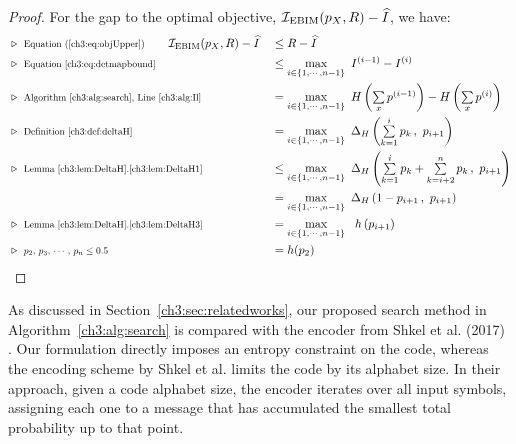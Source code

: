 \begin{proof}
    For the gap to the optimal objective, $\mathcal{I}_\text{EBIM}(p_X, R) - \widehat{I}$, we have:
    {\savebox\strutbox{$\vphantom{\dfrac11}$}
    \begin{alignat*}{2}
        \setlength{\arraycolsep}{-10pt}
        &\cmt{\text{Equation (\ref{ch3:eq:objUpper})}} \hspace{2em} \obj(p_X, R) - \widehat{I}                                      
        &&\leq R - \widehat{I} \\
        & \cmt{\text{Equation \eqref{ch3:eq:detmapbound}} }
        &&\leq \maxi \Imerged{i-1} - \Imerged{i} \\
        &\cmt{\text{Algorithm~\ref{ch3:alg:search}, Line~\ref{ch3:alg:Il}}}
        &&= \maxi \ent{ \xsum_x \Pmerged{i-1} } - \ent{ \xsum_x \Pmerged{i} } \\
        &\cmt{\text{Definition~\ref{ch3:def:deltaH}}}
        &&= \maxi \DeltaH{\xsum_{k=1}^i p_k}{p_{i+1}} \\
        &\cmt{\text{Lemma~\ref{ch3:lem:DeltaH}}.\ref{ch3:lem:DeltaH1}}       
        &&\leq \maxi \DeltaH{\xsum_{k=1}^i p_k + \xsum_{k=i+2}^{n} p_k}{p_{i+1}} \\
        &                                                           
        &&= \maxi \DeltaH{1 - p_{i+1}}{p_{i+1}} \\
        &\cmt{\text{Lemma~\ref{ch3:lem:DeltaH}}.\ref{ch3:lem:DeltaH3}}       
        &&= \maxi \ h\left(p_{i+1}\right) \\
        &\cmt{p_2,\, p_3,\, \cdots,\, p_n \leq 0.5}                           
        &&= h(p_2)
    \end{alignat*}
    }
\end{proof}


As discussed in Section~\ref{ch3:sec:relatedworks}, our proposed search method in Algorithm~\ref{ch3:alg:search} is compared with the encoder from Shkel et al. (2017) \cite{shkel2017single}. Our formulation directly imposes an entropy constraint on the code, whereas the encoding scheme by Shkel et al. limits the code by its alphabet size. In their approach, given a code alphabet size, the encoder iterates over all input symbols, assigning each one to a message that has accumulated the smallest total probability up to that point. 

